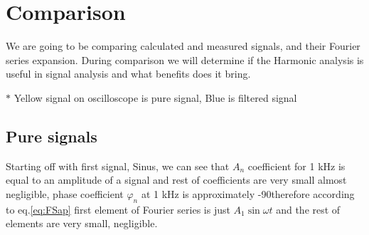 \documentclass[notitlepage, a4paper, 11pt]{article}
\begin{document}
	\section{Comparison}
	We are going to be comparing calculated and measured signals, and their Fourier series expansion. During comparison we will determine if the Harmonic analysis is useful in signal analysis and what benefits does it bring.
	
	$\ast$ Yellow signal on oscilloscope is pure signal, Blue is filtered signal
	\subsection{Pure signals}\label{sec:pure-signals}
	Starting off with first signal, Sinus, we can see that $A_n$ coefficient for 1 kHz is equal to an amplitude of a signal and rest of coefficients are very small almost negligible, phase coefficient $\varphi_n$ at 1 kHz is approximately -90\degree therefore according to eq.\eqref{eq:FSap} first element of Fourier series is just $A_1 \sin \omega t$ and the rest of elements are very small, negligible.
\end{document}
